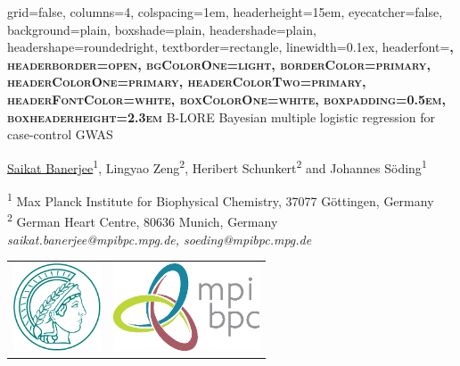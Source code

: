 \documentclass[a0paper,portrait,debug]{baposter}
\begin{document}
\setlength{\belowdisplayskip}{0pt} 
\setlength{\belowdisplayshortskip}{0pt} 
\setlength{\abovedisplayskip}{0pt} 
\setlength{\abovedisplayshortskip}{0pt}


\begin{poster}
{
%
%
	grid=false,
	columns=4,
	colspacing=1em,				%
	headerheight=15em, 				%
	eyecatcher=false,
	background=plain,
  	boxshade=plain,
	headershade=plain,  	
	headershape=roundedright,		%
	textborder=rectangle,			%
	linewidth=0.1ex,				%
	headerfont=\rmfamily\scshape\bfseries\large,
	headerborder=open,
	bgColorOne=light, 
	borderColor=primary,
	headerColorOne=primary,
	headerColorTwo=primary,
	headerFontColor=white,
	boxColorOne=white,
	boxpadding=0.5em,					%
	boxheaderheight=2.3em				%
}
{
}
{
	{\color{primary}B-LORE}
}
{
	{\color{primary}B}ayesian multiple {\color{primary}lo}gistic {\color{primary}re}gression for case-control GWAS%
}
{		
	\underline{Saikat Banerjee}\textsuperscript{1}, Lingyao Zeng\textsuperscript{2}, Heribert Schunkert\textsuperscript{2} and Johannes S\"oding\textsuperscript{1}

}
{
	\textsuperscript{1} Max Planck Institute for Biophysical Chemistry, 37077 G\"ottingen, Germany\\
	\textsuperscript{2} German Heart Centre, 80636 Munich, Germany\\[0.5em]
        {\color{primary} \emph{saikat.banerjee@mpibpc.mpg.de, soeding@mpibpc.mpg.de}}
}
{
\begin{tabular}{l l}
  \includegraphics[height=7em]{Max-Planck-Gesellschaft-no-txt.pdf} & \includegraphics[height=7em]{Print_Plotter_MPI-BPC_kurz-short_CMYK.eps} \\
\end{tabular}
}
{
}


\end{poster}
\end{document}
